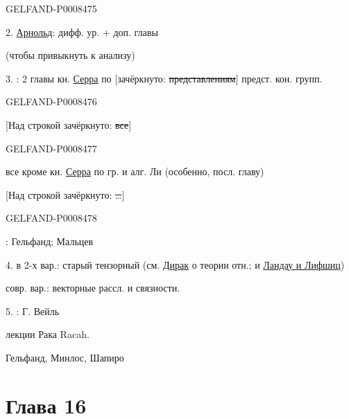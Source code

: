 \begin{GelfandAdjacentEvidence}{GELFAND-P000847}{5}


2. \uline{Арнольд}: дифф. ур. \(+\) доп. главы

(чтобы привыкнуть к анализу)

3. : 2 главы кн. \uline{Серра} по
[зачёркнуто: \sout{представлениям}] предст. кон. групп.
\end{GelfandAdjacentEvidence}
\begin{GelfandAdjacentEvidence}{GELFAND-P000847}{6}


[Над строкой зачёркнуто: \sout{все}]
\end{GelfandAdjacentEvidence}
\begin{GelfandAdjacentEvidence}{GELFAND-P000847}{7}


все кроме  кн. \uline{Серра} по гр. и алг. Ли
(особенно, посл. главу)

[Над строкой зачёркнуто: \sout{…}]
\end{GelfandAdjacentEvidence}
\begin{GelfandAdjacentEvidence}{GELFAND-P000847}{8}


: Гельфанд; Мальцев

4.  в 2-х вар.: старый тензорный
(см. \uline{Дирак} о теории отн.; и \uline{Ландау и Лифшиц})
\end{GelfandAdjacentEvidence}


совр. вар.: векторные рассл. и связности.

5. : Г. Вейль

лекции Рака \quad Racah.

Гельфанд, Минлос, Шапиро


\clearpage
{}
\section*{Глава 16}


